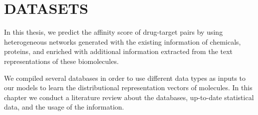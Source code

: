 \chapter{DATASETS}
\label{chapter:dataset_preparation}

In this thesis, we predict the affinity score of drug-target pairs by using heterogeneous networks generated with the existing information of chemicals, proteins, and enriched with additional information extracted from the text representations of these biomolecules.

We compiled several databases in order to use different data types as inputs to our models to learn the distributional representation vectors of molecules. In this chapter we conduct a literature review about the databases, up-to-date statistical data, and the usage of the information.










